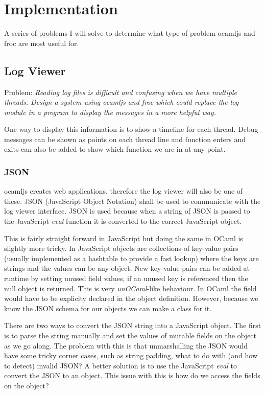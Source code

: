 \chapter{Implementation}
A series of problems I will solve to determine what type of problem ocamljs and froc are most useful for.
\section{Log Viewer}
Problem: \emph{Reading log files is difficult and confusing when we have multiple threads. Design a system using ocamljs and froc which could replace the log module in a program to display the messages in a more helpful way.}

One way to display this information is to show a timeline for each thread. Debug messages can be shown as points on each thread line and function enters and exits can also be added to show which function we are in at any point.

\subsection{JSON}
ocamljs creates web applications, therefore the log viewer will also be one of these. JSON (JavaScript Object Notation) shall be used to communicate with the log viewer interface. JSON is used because when a string of JSON is passed to the JavaScript \emph{eval} function it is converted to the correct JavaScript object.

This is fairly straight forward in JavaScript but doing the same in OCaml is slightly more tricky. In JavaScript objects are collections of key-value pairs (usually implemented as a hashtable to provide a fast lookup) where the keys are strings and the values can be any object. New key-value pairs can be added at runtime by setting unused field values, if an unused key is referenced then the null object is returned. This is very \emph{unOCaml}-like behaviour. In OCaml the field would have to be explicity declared in the object definition. However, because we know the JSON schema for our objects we can make a class for it.

There are two ways to convert the JSON string into a JavaScript object. The first is to parse the string manually and set the values of mutable fields on the object as we go along. The problem with this is that unmarshalling the JSON would have some tricky corner cases, such as string padding, what to do with (and how to detect) invalid JSON? A better solution is to use the JavaScript \emph{eval} to convert the JSON to an object. This issue with this is how do we access the fields on the object?

